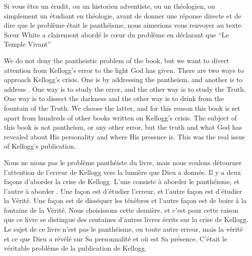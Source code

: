 Si vous êtes un érudit, ou un historien adventiste, ou un théologien, ou simplement un étudiant en théologie, avant de donner une réponse directe et de dire que le problème était le panthéisme, nous aimerions vous renvoyer au texte. Sœur White a clairement abordé le cœur du problème en déclarant que “Le Temple Vivant” 


We do not deny the pantheistic problem of the book, but we want to divert attention from Kellogg’s error to the light God has given. There are two ways to approach Kellogg’s crisis. One is by addressing the pantheism, and another is to address . One way is to study the error, and the other way is to study the Truth. One way is to dissect the darkness and the other way is to drink from the fountain of the Truth. We choose the latter, and for this reason this book is set apart from hundreds of other books written on Kellogg’s crisis. The subject of this book is not pantheism, or any other error, but the truth and what God has revealed about His personality and where His presence is. This was the real issue of Kellogg’s publication.


Nous ne nions pas le problème panthéiste du livre, mais nous voulons détourner l'attention de l'erreur de Kellogg vers la lumière que Dieu a donnée. Il y a deux façons d'aborder la crise de Kellogg. L'une consiste à aborder le panthéisme, et l'autre à aborder . Une façon est d'étudier l'erreur, et l'autre façon est d'étudier la Vérité. Une façon est de disséquer les ténèbres et l'autre façon est de boire à la fontaine de la Vérité. Nous choisissons cette dernière, et c'est pour cette raison que ce livre se distingue des centaines d'autres livres écrits sur la crise de Kellogg. Le sujet de ce livre n'est pas le panthéisme, ou toute autre erreur, mais la vérité et ce que Dieu a révélé sur Sa personnalité et où est Sa présence. C'était le véritable problème de la publication de Kellogg.


